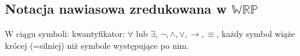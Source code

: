 \documentclass[12pt]{article}
\newcommand {\KRZ} {\ensuremath{\mathbb{KRZ}}}
\newcommand {\WRP} {\ensuremath{\mathbb{WRP}}}
\begin{document}
\subsection{Notacja nawiasowa zredukowana w \WRP}
W ciągu symboli: kwantyfikator: $\forall$ lub $\exists$, $\neg, \land, \lor, \to, \equiv$, każdy symbol wiąże krócej (=silniej) niż symbole występujące po nim.
%

%
\end{document}
